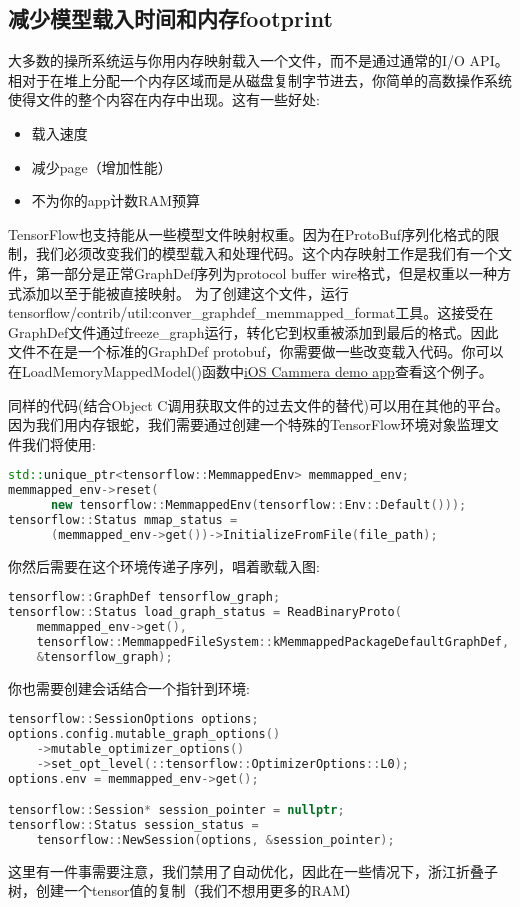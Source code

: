 \subsection{减少模型载入时间和内存footprint}
大多数的操所系统运与你用内存映射载入一个文件，而不是通过通常的I/O API。相对于在堆上分配一个内存区域而是从磁盘复制字节进去，你简单的高数操作系统使得文件的整个内容在内存中出现。这有一些好处:
\begin{itemize}
\item 载入速度
\item 减少page（增加性能）
\item 不为你的app计数RAM预算
\end{itemize}
TensorFlow也支持能从一些模型文件映射权重。因为在ProtoBuf序列化格式的限制，我们必须改变我们的模型载入和处理代码。这个内存映射工作是我们有一个文件，第一部分是正常GraphDef序列为protocol buffer wire格式，但是权重以一种方式添加以至于能被直接映射。
为了创建这个文件，运行tensorflow/contrib/util:conver\_graphdef\_memmapped\_format工具。这接受在GraphDef文件通过freeze\_graph运行，转化它到权重被添加到最后的格式。因此文件不在是一个标准的GraphDef protobuf，你需要做一些改变载入代码。你可以在LoadMemoryMappedModel()函数中\href{https://www.github.com/tensorflow/tensorflow/blob/r1.4/tensorflow/examples/ios/camera/tensorflow_utils.mm?l=147}{iOS Cammera demo app}查看这个例子。

同样的代码(结合Object C调用获取文件的过去文件的替代)可以用在其他的平台。因为我们用内存银蛇，我们需要通过创建一个特殊的TensorFlow环境对象监理文件我们将使用:
\begin{lstlisting}[language=C++]
std::unique_ptr<tensorflow::MemmappedEnv> memmapped_env;
memmapped_env->reset(
      new tensorflow::MemmappedEnv(tensorflow::Env::Default()));
tensorflow::Status mmap_status =
      (memmapped_env->get())->InitializeFromFile(file_path);
\end{lstlisting}
你然后需要在这个环境传递子序列，唱着歌载入图:
\begin{lstlisting}[language=C++]
tensorflow::GraphDef tensorflow_graph;
tensorflow::Status load_graph_status = ReadBinaryProto(
    memmapped_env->get(),
    tensorflow::MemmappedFileSystem::kMemmappedPackageDefaultGraphDef,
    &tensorflow_graph);
\end{lstlisting}
你也需要创建会话结合一个指针到环境:
\begin{lstlisting}[language=C++]
tensorflow::SessionOptions options;
options.config.mutable_graph_options()
    ->mutable_optimizer_options()
    ->set_opt_level(::tensorflow::OptimizerOptions::L0);
options.env = memmapped_env->get();

tensorflow::Session* session_pointer = nullptr;
tensorflow::Status session_status =
    tensorflow::NewSession(options, &session_pointer);

\end{lstlisting}
这里有一件事需要注意，我们禁用了自动优化，因此在一些情况下，浙江折叠子树，创建一个tensor值的复制（我们不想用更多的RAM）

